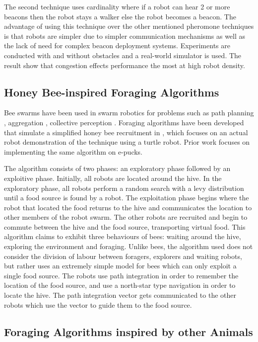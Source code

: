 The second technique uses cardinality where if a robot can hear 2 or more beacons then the robot stays a walker else the robot becomes a beacon. The advantage of using this technique over the other mentioned pheromone techniques is that robots are simpler due to simpler communication mechanisms as well as the lack of need for complex beacon deployment systems. Experiments are conducted with and without obstacles and a real-world simulator is used. The result show that congestion effects performance the most at high robot density. 

\subsection{Honey Bee-inspired Foraging Algorithms}
Bee swarms have been used in swarm robotics for problems such as path planning \cite{lin2009chaotic}, aggregation \cite{kernbach2009re}, collective perception \cite{schmickl2007collective}. Foraging algorithms have been developed that simulate a simplified honey bee recruitment in \cite{alers2014biologically}, which focuses on an actual robot demonstration of the technique using a turtle robot. Prior work focuses on implementing the same algorithm on e-pucks. 

The algorithm consists of two phases: an exploratory phase followed by an exploitive phase. Initially, all robots are located around the hive. In the exploratory phase, all robots perform a random search with a levy distribution until a food source is found by a robot. The exploitation phase begins where the robot that located the food returns to the hive and communicates the location to other members of the robot swarm. The other robots are recruited and begin to commute between the hive and the food source, transporting virtual food. This algorithm claims to exhibit three behaviours of bees: waiting around the hive, exploring the environment and foraging. Unlike bees, the algorithm used does not consider the division of labour between foragers, explorers and waiting robots, but rather uses an extremely simple model for bees which can only exploit a single food source. The robots use path integration in order to remember the location of the food source, and use a north-star type navigation in order to locate the hive. The path integration vector gets communicated to the other robots which use the vector to guide them to the food source. 

\subsection{Foraging Algorithms inspired by other Animals}

